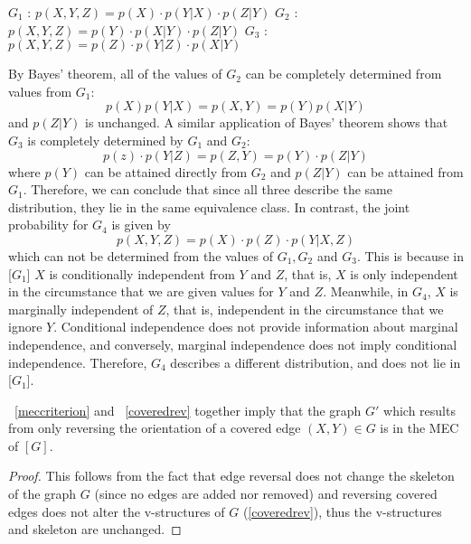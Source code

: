 \begin{example}
\begin{myindentpar}{3em}
\begin{spacing}{1.25}
	$G_{1}$ : \quad $p(X,Y,Z) = p(X) \cdot p(Y|X) \cdot p(Z|Y)$ \newline
	$G_{2}$ : \quad $p(X,Y,Z) = p(Y) \cdot p(X|Y) \cdot p(Z|Y)$ \newline
	$G_{3}$ : \quad $p(X,Y,Z) = p(Z) \cdot p(Y|Z) \cdot p(X|Y)$
	\end{spacing}
\end{myindentpar}
By Bayes' theorem, all of the values of $G_{2}$ can be completely determined from values from $G_{1}$:
	$$
	p(X)p(Y|X) = p(X,Y) = p(Y)p(X|Y)
	$$
and $p(Z|Y)$ is unchanged. A similar application of Bayes' theorem shows that $G_{3}$ is completely determined by $G_{1}$ and $G_{2}$:
	$$
	p(z) \cdot p(Y|Z) = p(Z,Y) = p(Y) \cdot p(Z|Y)
	$$
where $p(Y)$ can be attained directly from $G_{2}$ and $p(Z|Y)$ can be attained from $G_{1}$. Therefore, we can conclude that since all three describe the same distribution, they lie in the same equivalence class. In contrast, the joint probability for $G_{4}$ is given by
	$$
	p(X,Y,Z) = p(X) \cdot p(Z) \cdot p(Y|X,Z)
	$$
which can not be determined from the values of $G_{1}, G_{2}$ and $G_{3}$. This is because in [$G_{1}$] %
$X$ is conditionally independent from $Y$ and $Z$, that is, $X$ is only independent in the circumstance that we are given values for $Y$ and $Z$. Meanwhile, in $G_{4}$, $X$ is marginally independent of $Z$, that is, independent in the circumstance that we ignore $Y$. Conditional independence does not provide information about marginal independence, and conversely, marginal independence does not imply conditional independence. Therefore, $G_{4}$ describes a different distribution, and does not lie in [$G_{1}$]. 

\end{example}


\begin{corollary}\label{coveredMEC}~\cref{meccriterion} and ~\cref{coveredrev} together imply that the graph $G'$ which results from only reversing the orientation of a covered edge $(X, Y) \in G$ is in the MEC of $[G]$. 
\begin{proof}
This follows from the fact that edge reversal does not change the skeleton of the graph $G$ (since no edges are added nor removed) and reversing covered edges does not alter the v-structures of $G$ (\cref{coveredrev}), thus the v-structures and skeleton are unchanged. 
\end{proof}
\end{corollary}



